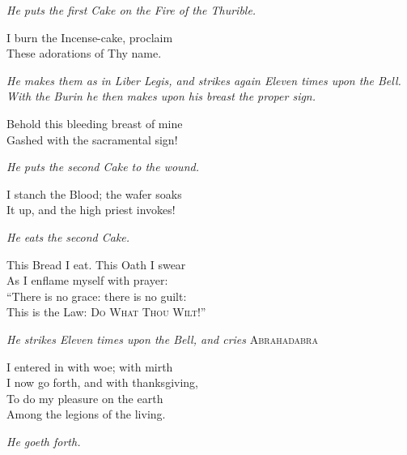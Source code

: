 \textit{He puts the first Cake on the Fire of the Thurible.}

\begin{quoting}[indentfirst=false]
I burn the Incense-cake, proclaim \\
These adorations of Thy name.
\end{quoting}

\textit{He makes them as in Liber Legis, and strikes again Eleven times upon the Bell. With the Burin he then makes upon his breast the proper sign.}

\begin{quoting}[indentfirst=false]
Behold this bleeding breast of mine \\
Gashed with the sacramental sign!
\end{quoting}

\textit{He puts the second Cake to the wound.}

\begin{quoting}[indentfirst=false]
I stanch the Blood; the wafer soaks \\
It up, and the high priest invokes!
\end{quoting}

\textit{He eats the second Cake.}

\begin{quoting}[indentfirst=false]
This Bread I eat. This Oath I swear \\
As I enflame myself with prayer: \\
\enquote{There is no grace: there is no guilt: \\
This is the Law: \textsc{Do What Thou Wilt!}}
\end{quoting}

\textit{He strikes Eleven times upon the Bell, and cries} \textsc{Abrahadabra}

\begin{quoting}[indentfirst=false]
I entered in with woe; with mirth \\
I now go forth, and with thanksgiving, \\
To do my pleasure on the earth \\
Among the legions of the living.
\end{quoting}

\textit{He goeth forth.}
